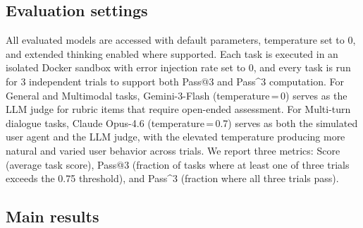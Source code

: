 \documentclass{article}
\begin{document}
\subsection{Evaluation settings}
\label{sec:setup}

All evaluated models are accessed with default parameters, temperature set to 0, and extended thinking enabled where supported.
Each task is executed in an isolated Docker sandbox with error injection rate set to 0, and every task is run for 3 independent trials to support both Pass@3 and Pass\textasciicircum{}3 computation.
For General and Multimodal tasks, Gemini-3-Flash (temperature\,=\,0) serves as the LLM judge for rubric items that require open-ended assessment.
For Multi-turn dialogue tasks, Claude Opus-4.6 (temperature\,=\,0.7) serves as both the simulated user agent and the LLM judge, with the elevated temperature producing more natural and varied user behavior across trials.
We report three metrics: Score (average task score), Pass@3 (fraction of tasks where at least one of three trials exceeds the 0.75 threshold), and Pass\textasciicircum{}3 (fraction where all three trials pass).

\subsection{Main results}
\label{sec:results}
\end{document}

